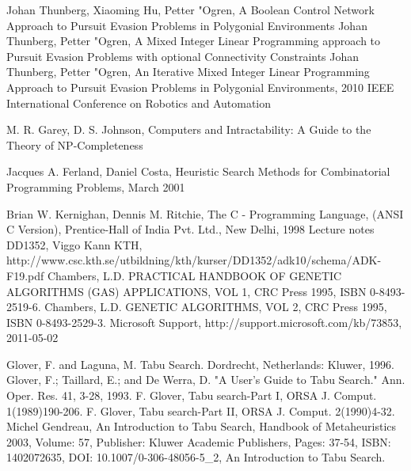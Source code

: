 \begin{thebibliography}{99}
  Johan Thunberg, Xiaoming Hu, Petter "Ogren, A Boolean Control Network Approach to Pursuit Evasion Problems in Polygonial Environments
 Johan Thunberg, Petter "Ogren, A Mixed Integer Linear Programming approach to Pursuit Evasion Problems with optional Connectivity Constraints
 Johan Thunberg, Petter "Ogren, An Iterative Mixed Integer Linear Programming Approach to Pursuit Evasion Problems in Polygonial Environments, 2010 IEEE International Conference on Robotics and Automation

 M. R. Garey, D. S. Johnson, Computers and Intractability: A Guide to the Theory of NP-Completeness

Jacques A. Ferland, Daniel Costa, Heuristic Search Methods for Combinatorial Programming Problems, March 2001

 Brian W. Kernighan, Dennis M. Ritchie, The C - Programming Language, (ANSI C Version), Prentice-Hall of India Pvt. Ltd., New Delhi, 1998
Lecture notes DD1352, Viggo Kann KTH,  http://www.csc.kth.se/utbildning/kth/kurser/DD1352/adk10/schema/ADK-F19.pdf
 Chambers, L.D. PRACTICAL HANDBOOK OF GENETIC ALGORITHMS (GAS) APPLICATIONS, VOL 1, CRC Press 1995, ISBN 0-8493-2519-6.
 Chambers, L.D. GENETIC ALGORITHMS, VOL 2, CRC Press 1995, ISBN 0-8493-2529-3.
 Microsoft Support, http://support.microsoft.com/kb/73853, 2011-05-02


  Glover, F. and Laguna, M. Tabu Search. Dordrecht, Netherlands: Kluwer, 1996.
  Glover, F.; Taillard, E.; and De Werra, D. "A User's Guide to Tabu Search." Ann. Oper. Res. 41, 3-28, 1993.
 F. Glover, Tabu search-Part I, ORSA J. Comput. 1(1989)190-206.
 F. Glover, Tabu search-Part II, ORSA J. Comput. 2(1990)4-32.
 Michel Gendreau, An Introduction to Tabu Search, Handbook of Metaheuristics 2003, Volume: 57, Publisher: Kluwer Academic Publishers, Pages: 37-54, ISBN: 1402072635, DOI: 10.1007/0-306-48056-5\_2, An Introduction to Tabu Search.


\end{thebibliography}
